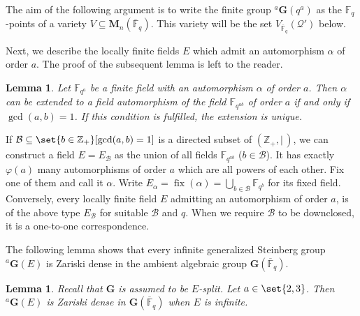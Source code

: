 \documentclass[a4paper,12pt]{amsproc}
\DeclareMathOperator{\fix}{fix}%
\theoremstyle{plain}
\newtheorem{lemma}[definition]{Lemma}
\theoremstyle{definition}
\begin{document}
\medskip

The aim of the following argument is to write the finite group ${}^a\mathbf{G}(q^a)$ as the $\mathbb{F}_q$-points of a variety $V\subseteq\mathbf{M}_n(\overline{\mathbb{F}}_q)$. This variety will be the set $V_{\overline{\mathbb{F}}_q}(\mathcal{Q}')$ below.
    
Next, we describe the locally finite fields $E$ which admit an automorphism $\alpha$ of order $a$. The proof of the subsequent lemma is left to the reader.
	
\begin{lemma}\label{lem:ext_fld_aut}
Let $\mathbb{F}_{q^a}$ be a finite field with an automorphism $\alpha$ of order $a$. Then $\alpha$ can be extended to a field automorphism of the field $\mathbb{F}_{q^{ab}}$ of order $a$ if and only if $\gcd(a,b)=1$. If this condition is fulfilled, the extension is unique.
\end{lemma}
	
If $\mathcal{B}\subseteq\set{b\in\mathbb{Z}_+}[\gcd(a,b)=1]$ is a directed subset of $(\mathbb{Z}_+,\mid\,)$, we can construct a field $E=E_{\mathcal{B}}$ as the union of all fields $\mathbb{F}_{q^{ab}}$ ($b\in\mathcal{B}$). It has exactly $\varphi(a)$  many automorphisms of order $a$ which are all powers of each other. Fix one of them and call it $\alpha$. Write $E_\alpha=\fix(\alpha)=\bigcup_{b\in\mathcal{B}}\mathbb{F}_{q^b}$ for its fixed field. Conversely, every locally finite field $E$ admitting an automorphism of order $a$, is of the above type $E_{\mathcal{B}}$ for suitable $\mathcal{B}$ and $q$. When we require $\mathcal{B}$ to be downclosed, it is a one-to-one correspondence.

The following lemma shows that every infinite generalized Steinberg group ${}^a\mathbf{G}(E)$ is Zariski dense in the ambient algebraic group $\mathbf{G}(\overline{\mathbb{F}}_q)$.
	
\begin{lemma}\label{lem:twst_grp_zar_dense}
Recall that $\mathbf{G}$ is assumed to be $E$-split. Let $a\in\set{2,3}$. Then ${}^a\mathbf{G}(E)$ is Zariski dense in $\mathbf{G}(\overline{\mathbb{F}}_q)$ when $E$ is infinite.
\end{lemma}
	
\end{document}
